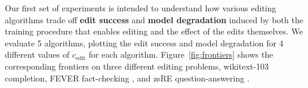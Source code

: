 \documentclass{article}
\begin{document}
Our first set of experiments is intended to understand how various editing algorithms trade off \textbf{edit success} and \textbf{model degradation} induced by both the training procedure that enables editing and the effect of the edits themselves. We evaluate 5 algorithms, plotting the edit success and model degradation for 4 different values of $c_\text{edit}$ for each algorithm. Figure~\ref{fig:frontiers} shows the corresponding frontiers on three different editing problems, wikitext-103 completion, FEVER fact-checking \citep{Thorne18Fever}, and zsRE question-answering \citep{levy2017zero}.
\end{document}
